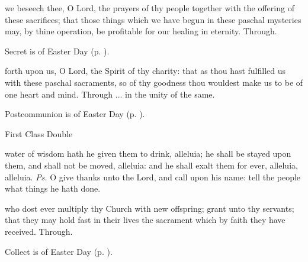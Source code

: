 
\secret
{} we beseech thee, O Lord, the prayers of thy people together with the offering of these sacrifices; that those things which we have begun in these paschal mysteries may, by thine operation, be profitable for our healing in eternity. Through.
\begin{rubric}
     Secret is of Easter Day (p. \pageref{EasterSecret}).
\end{rubric}


\postcommunion
{} forth upon us, O Lord, the Spirit of thy charity: that as thou hast fulfilled us with these paschal sacraments, so of thy goodness thou wouldest make us to be of one heart and mind. Through ... in the unity of the same.
\begin{rubric}
     Postcommunion is of Easter Day (p. \pageref{EasterPostcommunion}).
\end{rubric}

\begin{inhead}
    {First Class Double}
\end{inhead}

\introit
{} water of wisdom hath he given them to drink, alleluia; he shall be stayed upon them, and shall not be moved, alleluia: and he shall exalt them for ever, alleluia, alleluia. \textit{Ps.} O give thanks unto the Lord, and call upon his name: tell the people what things he hath done.

\collect
 who dost ever multiply thy Church with new offspring; grant unto thy servants; that they may hold fast in their lives the sacrament which by faith they have received. Through.
\begin{rubric}
     Collect is of Easter Day (p. \pageref{EasterCollect}).
\end{rubric}

